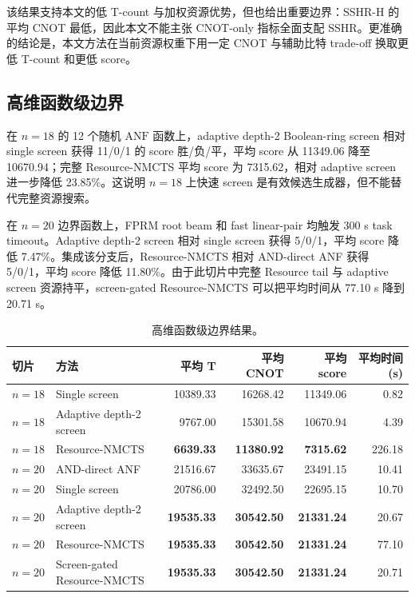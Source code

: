 \documentclass[UTF8,fontset=macnew,11pt]{ctexart}
\newcommand{\method}{Resource-NMCTS}
\newcommand{\screen}{Boolean-ring screen}
\newcommand{\anf}{\ensuremath{\mathrm{ANF}}}
\begin{document}
该结果支持本文的低 T-count 与加权资源优势，但也给出重要边界：SSHR-H 的平均 CNOT 最低，因此本文不能主张 CNOT-only 指标全面支配 SSHR。更准确的结论是，本文方法在当前资源权重下用一定 CNOT 与辅助比特 trade-off 换取更低 T-count 和更低 score。

\subsection{高维函数级边界}

在 $n=18$ 的 12 个随机 \anf{} 函数上，adaptive depth-2 \screen{} 相对 single screen 获得 11/0/1 的 score 胜/负/平，平均 score 从 11349.06 降至 10670.94；完整 \method{} 平均 score 为 7315.62，相对 adaptive screen 进一步降低 23.85\%。这说明 $n=18$ 上快速 screen 是有效候选生成器，但不能替代完整资源搜索。

在 $n=20$ 边界函数上，FPRM root beam 和 fast linear-pair 均触发 300 s task timeout。Adaptive depth-2 screen 相对 single screen 获得 5/0/1，平均 score 降低 7.47\%。集成该分支后，\method{} 相对 AND-direct ANF 获得 5/0/1，平均 score 降低 11.80\%。由于此切片中完整 Resource tail 与 adaptive screen 资源持平，screen-gated \method{} 可以把平均时间从 77.10 s 降到 20.71 s。

\begin{table}[t]
\centering
\scriptsize
\caption{高维函数级边界结果。}
\label{tab:n18n20}
\begin{tabular}{llrrrr}
\toprule
切片 & 方法 & 平均 T & 平均 CNOT & 平均 score & 平均时间(s) \\
\midrule
$n=18$ & Single screen & 10389.33 & 16268.42 & 11349.06 & 0.82 \\
$n=18$ & Adaptive depth-2 screen & 9767.00 & 15301.58 & 10670.94 & 4.39 \\
$n=18$ & \method{} & \textbf{6639.33} & \textbf{11380.92} & \textbf{7315.62} & 226.18 \\
$n=20$ & AND-direct ANF & 21516.67 & 33635.67 & 23491.15 & 10.41 \\
$n=20$ & Single screen & 20786.00 & 32492.50 & 22695.15 & 10.70 \\
$n=20$ & Adaptive depth-2 screen & \textbf{19535.33} & \textbf{30542.50} & \textbf{21331.24} & 20.67 \\
$n=20$ & \method{} & \textbf{19535.33} & \textbf{30542.50} & \textbf{21331.24} & 77.10 \\
$n=20$ & Screen-gated \method{} & \textbf{19535.33} & \textbf{30542.50} & \textbf{21331.24} & 20.71 \\
\bottomrule
\end{tabular}
\end{table}
\end{document}
